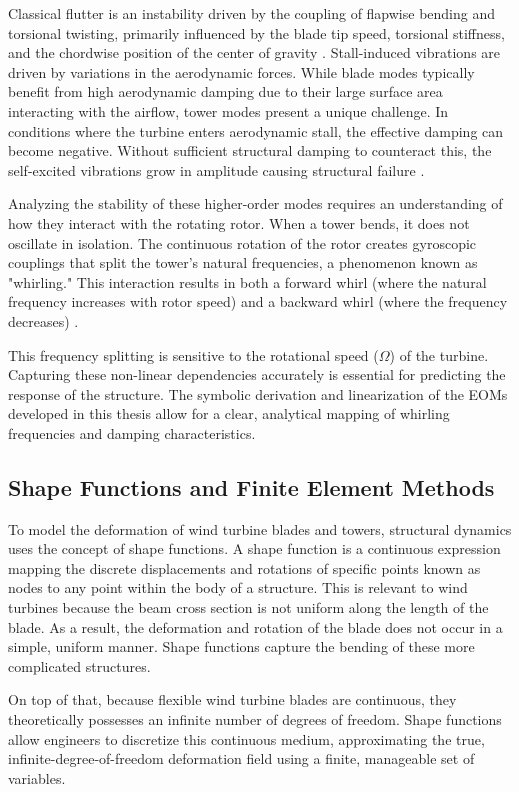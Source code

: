 \documentclass[final,onecolumn]{IEEEtran}
\begin{document}
Classical flutter is an instability driven by the coupling of flapwise bending and torsional twisting, primarily influenced by the blade tip speed, torsional stiffness, and the chordwise position of the center of gravity \cite{hansen2007aeroelastic}. Stall-induced vibrations are driven by variations in the aerodynamic forces. While blade modes typically benefit from high aerodynamic damping due to their large surface area interacting with the airflow, tower modes present a unique challenge. In conditions where the turbine enters aerodynamic stall, the effective damping can become negative. Without sufficient structural damping to counteract this, the self-excited vibrations grow in amplitude causing structural failure \cite{hansen2007aeroelastic}.

Analyzing the stability of these higher-order modes requires an understanding of how they interact with the rotating rotor. When a tower bends, it does not oscillate in isolation. The continuous rotation of the rotor creates gyroscopic couplings that split the tower's natural frequencies, a phenomenon known as "whirling." This interaction results in both a forward whirl (where the natural frequency increases with rotor speed) and a backward whirl (where the frequency decreases) \cite{hansen2003improved}.

This frequency splitting is sensitive to the rotational speed ($\Omega$) of the turbine. Capturing these non-linear dependencies accurately is essential for predicting the response of the structure. The symbolic derivation and linearization of the EOMs developed in this thesis allow for a clear, analytical mapping of whirling frequencies and damping characteristics.

\subsection{Shape Functions and Finite Element Methods}
To model the deformation of wind turbine blades and towers, structural dynamics uses the concept of shape functions. A shape function is a continuous expression mapping the discrete displacements and rotations of specific points known as nodes to any point within the body of a structure. This is relevant to wind turbines because the beam cross section is not uniform along the length of the blade. As a result, the deformation and rotation of the blade does not occur in a simple, uniform manner. Shape functions capture the bending of these more complicated structures.

On top of that, because flexible wind turbine blades are continuous, they theoretically possesses an infinite number of degrees of freedom. Shape functions allow engineers to discretize this continuous medium, approximating the true, infinite-degree-of-freedom deformation field using a finite, manageable set of variables.
\end{document}
